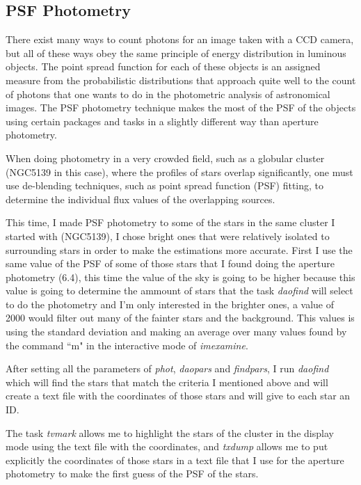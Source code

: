 \subsection{PSF Photometry}

There exist many ways to count photons for an image taken with a CCD camera, but all of these ways obey the same principle of energy distribution in luminous objects. The point spread function for each of these objects is an assigned measure from the probabilistic distributions that approach quite well to the count of photons that one wants to do in the photometric analysis of astronomical images. The PSF photometry technique makes the most of the PSF of the objects using certain packages and tasks in a slightly different way than aperture photometry.

When doing photometry in a very crowded field, such as a globular cluster (NGC5139 in this case), where the profiles of stars overlap significantly, one must use de-blending techniques, such as point spread function (PSF) fitting, to determine the individual flux values of the overlapping sources. 

This time, I made PSF photometry to some of the stars in the same cluster I started with (NGC5139), I chose bright ones that were relatively isolated to surrounding stars in order to make the estimations more accurate. First I use the same value of the PSF of some of those stars that I found doing the aperture photometry (6.4), this time the value of the sky is going to be higher because this value is going to determine the ammount of stars that the task \textit{daofind} will select to do the photometry and I'm only interested in the brighter ones, a value of 2000 would filter out many of the fainter stars and the background. This values is using the standard deviation and making an average over many values found by the command ``m" in the interactive mode of \textit{imexamine}. 

After setting all the parameters of \textit{phot}, \textit{daopars} and \textit{findpars}, I run \textit{daofind} which will find the stars that match the criteria I mentioned above and will create a text file with the coordinates of those stars and will give to each star an ID.

The task \textit{tvmark} allows me to highlight the stars of the cluster in the display mode using the text file with the coordinates, and \textit{txdump} allows me to  put explicitly the coordinates of those stars in a text file that I use for the aperture photometry to make the first guess of the PSF of the stars.

